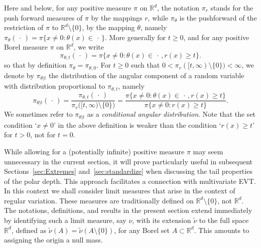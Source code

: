 \documentclass{article}
\numberwithin{equation}{section}
\renewcommand{\P}{\mathbb{P}}
\newcommand{\rset}{\mathbb{R}}
\newcommand{\point}{\,\cdot\,}
\newcommand{\PP}{\P}%
\begin{document}
Here and below,  for any positive measure $\pi$ on $\rset^d$,   the notation $\pi_r$  stands for the push forward measures of $\pi$ by the mappings $r$, while  $\pi_\theta$ is the pushforward of the restriction of $\pi$ to $\rset^d\setminus\{0\}$, by the mapping $\theta$, namely
$\pi_\theta(\point) = \pi\{x\neq 0: \theta(x) \in \point\}$. More generally   for $t\ge 0$,  and for any positive Borel measure $\pi$  on $\rset^d$, we write 
$$
\pi_{\theta,t}(\point) = \pi\{x \neq 0: \theta(x)\in \point, r(x)\ge t\}. 
$$
so that by definition $\pi_\theta= \pi_{\theta,0}$. %
For $t\ge 0$ such that
$0 < \pi_r([t,\infty)\setminus\{0\})< \infty$, we denote by  $\pi_{\theta|t}$ the distribution of the angular component of a random variable with distribution proportional to $\pi_{\theta,t}$, namely %
    \begin{equation}\label{eq:def_Pr_Ptheta_r}
    \pi_{\theta|t}(\point) = %
    \frac{\pi_{\theta,t}(\point)}{\pi_{r}\big([t,\infty)\setminus\{0\}\big)} =
    \frac{\pi\{x\neq 0: \theta(x)\in \point, r(x)\ge t \}}{\pi\{x\neq 0: r(x)\ge t \}}. %
\end{equation}
  We sometimes refer to $\pi_{\theta|t}$ as a  \emph{conditional angular distribution}. Note that the set condition `$x\neq 0$' in the above definition is weaker than    the condition  `$r(x)\ge t$' for $t>0$,  not for $t=0$.

While allowing for a (potentially infinite) positive  measure \(\pi\) may seem
unnecessary in the current section, it will prove particularly useful
in subsequent Sections~\ref{sec:Extremes} and~\ref{sec:standardize} when discussing the tail properties of the 
polar depth. This approach facilitates a connection with multivariate EVT.
In this context we shall consider limit measures that arise in the context of regular variation. These measures are traditionally defined on $\rset^d\setminus\{0\}$, not $\rset^d$. The  notations,  definitions, and results  in the present section extend immediately  by identifying such a limit measure, say $\nu$, with its extension  $\tilde \nu$ to the full space  $\rset^d$, defined as $\tilde \nu(A) = \tilde\nu(A\setminus\{0\})$, for any Borel set $A\subset \rset^d$. This amounts to assigning the origin a null mass. 
   
\end{document}
